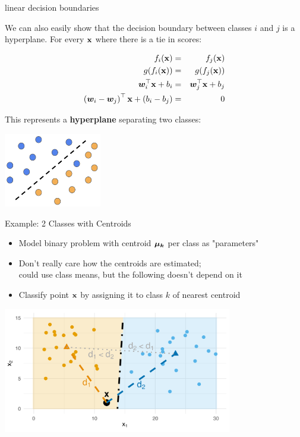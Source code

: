 \documentclass[11pt,compress,t,notes=noshow, xcolor=table]{beamer}
\begin{document}
  
\begin{vbframe}{linear decision boundaries}
  
We can also easily show that the decision boundary between classes $i$ and $j$ is a hyperplane. For every $\xv$ where there is a tie in scores: 

\begin{eqnarray*}
  \fkx[i] &=& \fkx[j] \\
  g(\fkx[i]) &=& g(\fkx[j]) \\
  \bm{w}_i^\top \xv + b_i &=& \bm{w}_j^\top \xv + b_j \\
  \left(\bm{w}_i - \bm{w}_j\right)^\top \xv + \left(b_i - b_j\right) &=& 0 
\end{eqnarray*}

This represents a \textbf{hyperplane} separating two classes:

\begin{center}
\includegraphics[width=0.32\textwidth]{figure_man/linear_boundary.png} 
\end{center}
\end{vbframe}

\begin{vbframe}{Example: 2 Classes with Centroids}

\begin{itemize}
\item Model binary problem with centroid $\muk$ per class as "parameters"

\item  Don't really care how the centroids are estimated; \\
could use class means, but the following doesn't depend on it

\item Classify point $\xv$ by assigning it to class $k$ of nearest centroid

\end{itemize}

\lz

\begin{center}
\includegraphics[width=0.75\textwidth]{figure/nearest_centroid_classifier.png} 
\end{center}

\end{vbframe}
\end{document}

